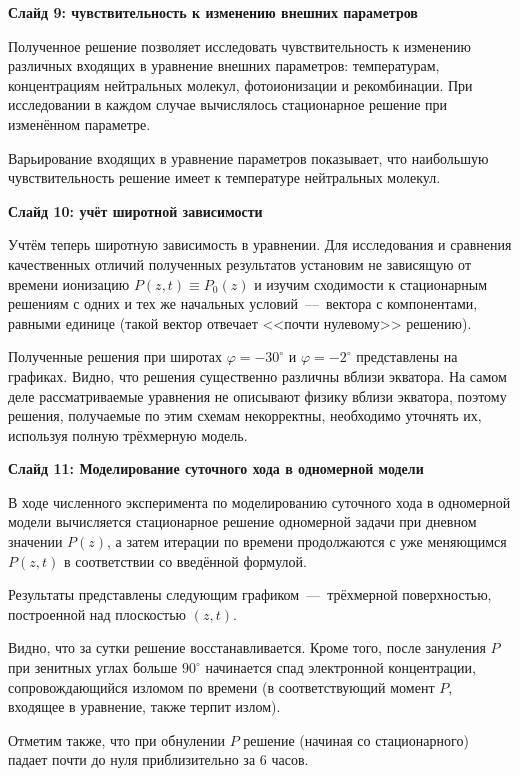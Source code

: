 \documentclass[2pt, a4paper, fleqn]{extarticle}
\begin{document}
\medskip
 
{\bf Слайд 9: чувствительность к изменению внешних параметров}

Полученное решение позволяет исследовать чувствительность к изменению различных входящих в уравнение внешних параметров: температурам, концентрациям нейтральных молекул, фотоионизации и рекомбинации. При исследовании в каждом случае вычислялось стационарное решение при изменённом параметре.

Варьирование входящих в уравнение параметров показывает, что наибольшую чувствительность решение имеет к температуре нейтральных молекул. 

\medskip

{\bf Слайд 10: учёт широтной зависимости}

Учтём теперь широтную зависимость в уравнении.  Для исследования и сравнения качественных отличий полученных результатов установим не зависящую от времени ионизацию $P(z, t) \equiv P_0(z)$ и изучим сходимости к стационарным решениям с одних и тех же начальных условий~---~вектора с компонентами, равными единице (такой вектор отвечает <<почти нулевому>> решению). 

Полученные решения при широтах $\varphi = -30^\circ$ и $\varphi=-2^\circ$ представлены на графиках. Видно, что решения существенно различны вблизи экватора. На самом деле рассматриваемые уравнения не описывают физику вблизи экватора, поэтому решения, получаемые по этим схемам некорректны, необходимо уточнять их, используя полную трёхмерную модель.

\medskip

{\bf Слайд 11: Моделирование суточного хода в одномерной модели}

В ходе численного эксперимента по моделированию суточного хода в одномерной модели вычисляется стационарное решение одномерной задачи при дневном значении $P(z)$, а затем итерации по времени продолжаются с уже меняющимся $P(z, t)$ в соответствии со введённой формулой.

Результаты представлены следующим графиком~---~трёхмерной поверхностью, построенной над плоскостью $(z, t)$.

Видно, что за сутки решение восстанавливается. Кроме того, после зануления $P$ при зенитных углах больше $90^\circ$ начинается спад электронной концентрации, сопровождающийся изломом по времени (в соответствующий  момент $P$, входящее в уравнение, также терпит излом).

Отметим также, что при обнулении $P$ решение (начиная со стационарного) падает почти до нуля приблизительно за $6$ часов.
\end{document}
